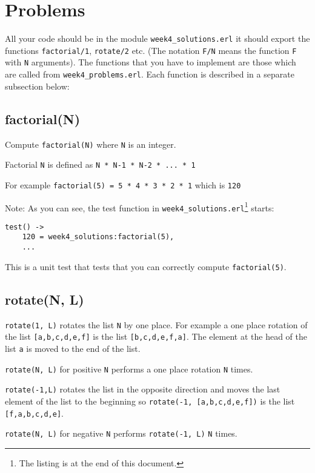 \documentclass[12pt]{hitec}
\begin{document}
\section{Problems}

All your code should be in the module \verb+week4_solutions.erl+ it
should export the functions \verb+factorial/1+, \verb+rotate/2+ etc.
(The notation \verb+F/N+ means the function \verb+F+ with \verb+N+
arguments).  The functions that you have to implement are those which
are called from \verb+week4_problems.erl+. Each function is described
in a separate subsection below:

\subsection{factorial(N)}

Compute \verb+factorial(N)+ where \verb+N+ is an integer.

Factorial \verb+N+ is defined as \verb+N * N-1 * N-2 * ... * 1+

For example \verb+factorial(5) = 5 * 4 * 3 * 2 * 1+ which is
\verb+120+

Note: As you can see, the test function in 
\verb+week4_solutions.erl+\footnote{The listing is at the end of this document.} 
starts:

\begin{Verbatim}[frame=single]
test() ->
    120 = week4_solutions:factorial(5),
    ...
\end{Verbatim}

This is a unit test that tests that you can correctly compute
\verb+factorial(5)+.

\subsection{rotate(N, L)}

\verb+rotate(1, L)+ rotates the list \verb+N+ by one place.
For example a one place rotation of the list \verb+[a,b,c,d,e,f]+ is the list
\verb+[b,c,d,e,f,a]+. The element at the head of the list \verb+a+ is moved
to the end of the list.

\verb+rotate(N, L)+ for positive \verb+N+ performs a one place rotation \verb+N+ times.

\verb+rotate(-1,L)+ rotates the list in the opposite direction and moves the
last element of the list to the beginning 
so  \verb+rotate(-1, [a,b,c,d,e,f])+ is the list
\verb+[f,a,b,c,d,e]+.

\verb+rotate(N, L)+ for negative \verb+N+ performs \verb+rotate(-1, L)+ \verb+N+ times.
\end{document}
